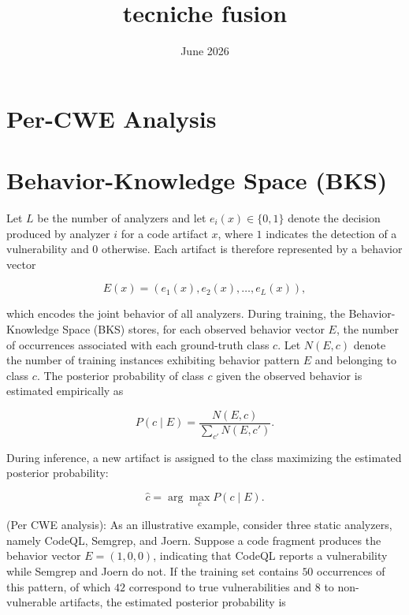 \documentclass{article}
\title{tecniche fusion}
\date{June 2026}
\begin{document}
\maketitle

\section{Per-CWE Analysis}

\section{Behavior-Knowledge Space (BKS)}
Let $L$ be the number of analyzers and let $e_i(x)\in\{0,1\}$ denote the decision produced by analyzer $i$ for a code artifact $x$,
where $1$ indicates the detection of a vulnerability and $0$ otherwise.
Each artifact is therefore represented by a behavior vector

\begin{equation}
E(x) = (e_1(x), e_2(x), \ldots, e_L(x)),
\end{equation}

which encodes the joint behavior of all analyzers.
During training, the Behavior-Knowledge Space (BKS) stores, for each observed behavior vector $E$,
the number of occurrences associated with each ground-truth class $c$.
Let $N(E,c)$ denote the number of training instances exhibiting behavior pattern $E$ and belonging to class $c$.
The posterior probability of class $c$ given the observed behavior is estimated empirically as

\begin{equation}
P(c \mid E) =
\frac{N(E,c)}
{\sum_{c'} N(E,c')}.
\end{equation}

During inference, a new artifact is assigned to the class maximizing the estimated posterior probability:

\begin{equation}
\hat{c} =
\arg\max_c P(c \mid E).
\end{equation}

(Per CWE analysis): As an illustrative example, consider three static analyzers, namely CodeQL, Semgrep, and Joern.
Suppose a code fragment produces the behavior vector $E=(1,0,0)$, indicating that CodeQL reports a vulnerability while Semgrep and Joern do not.
If the training set contains $50$ occurrences of this pattern, of which $42$ correspond to true vulnerabilities
and $8$ to non-vulnerable artifacts, the estimated posterior probability is
\end{document}
